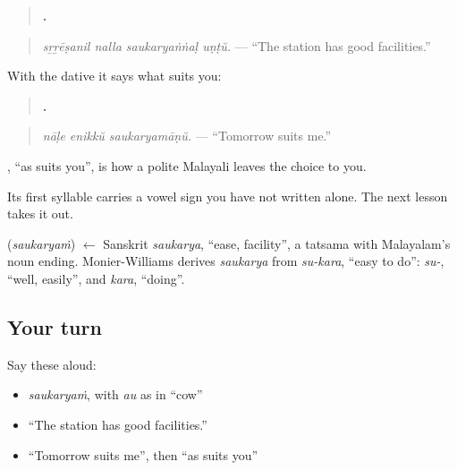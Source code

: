 \begin{quote}
\textbf{   .}
\end{quote}

\begin{quote}
\emph{sṟṟēṣanil nalla saukaryaṅṅaḷ uṇṭŭ.} — \textquotedblleft{}The station has good facilities.\textquotedblright{}
\end{quote}

With the dative it says what suits you:

\begin{quote}
\textbf{  .}
\end{quote}

\begin{quote}
\emph{nāḷe enikkŭ saukaryamāṇŭ.} — \textquotedblleft{}Tomorrow suits me.\textquotedblright{}
\end{quote}

\textbf{  }, \textquotedblleft{}as suits you\textquotedblright{}, is how a polite Malayali leaves the choice to you.

Its first syllable carries a vowel sign you have not written alone. The next lesson takes it out.

\begin{cousinweb}
\textbf{} (\emph{saukaryaṁ}) $\leftarrow$ Sanskrit \emph{saukarya}, \textquotedblleft{}ease, facility\textquotedblright{}, a tatsama with Malayalam's noun ending. Monier-Williams derives \emph{saukarya} from \emph{su-kara}, \textquotedblleft{}easy to do\textquotedblright{}: \emph{su-}, \textquotedblleft{}well, easily\textquotedblright{}, and \emph{kara}, \textquotedblleft{}doing\textquotedblright{}.
\end{cousinweb}

\subsection*{Your turn}
Say these aloud:

\begin{itemize}
\raggedright
  \item \emph{saukaryaṁ}, with \emph{au} as in \textquotedblleft{}cow\textquotedblright{}
  \item \textquotedblleft{}The station has good facilities.\textquotedblright{}
  \item \textquotedblleft{}Tomorrow suits me\textquotedblright{}, then \textquotedblleft{}as suits you\textquotedblright{}
\end{itemize}


